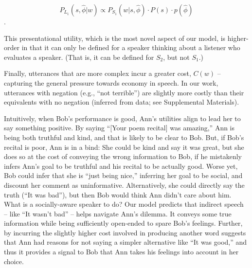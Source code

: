 \documentclass[floatsintext,man]{apa6}
\theoremstyle{definition}
\theoremstyle{definition}
\theoremstyle{definition}
\theoremstyle{remark}
\begin{document}
\[P_{L_1}(s, \hat{\phi} | w) \propto P_{S_1}(w | s, \hat{\phi}) \cdot P(s) \cdot p(\hat{\phi})\].

This presentational utility, which is the most novel aspect of our
model, is higher-order in that it can only be defined for a speaker
thinking about a listener who evaluates a speaker. (That is, it can be
defined for \(S_2\), but not \(S_1\).)

Finally, utterances that are more complex incur a greater cost, \(C(w)\)
-- capturing the general pressure towards economy in speech. In our
work, utterances with negation (e.g., \enquote{not terrible}) are
slightly more costly than their equivalents with no negation (inferred
from data; see Supplemental Materials).

Intuitively, when Bob's performance is good, Ann's utilities align to
lead her to say something positive. By saying \enquote{{[}Your poem
recital{]} was amazing,} Ann is being both truthful and kind, and that
is likely to be clear to Bob. But, if Bob's recital is poor, Ann is in a
bind: She could be kind and say it was great, but she does so at the
cost of conveying the wrong information to Bob, if he mistakenly infers
Ann's goal to be truthful and his recital to be actually good. Worse
yet, Bob could infer that she is \enquote{just being nice,} inferring
her goal to be social, and discount her comment as uninformative.
Alternatively, she could directly say the truth (\enquote{It was bad}),
but then Bob would think Ann didn't care about him. What is a
socially-aware speaker to do? Our model predicts that indirect speech --
like \enquote{It wasn't bad} -- helps navigate Ann's dilemma. It conveys
some true information while being sufficiently open-ended to spare Bob's
feelings. Further, by incurring the slightly higher cost involved in
producing another word suggests that Ann had reasons for not saying a
simpler alternative like \enquote{It was good,} and thus it provides a
signal to Bob that Ann takes his feelings into account in her choice.
\end{document}
